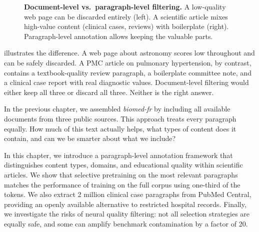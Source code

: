 \begin{figure}[t]
\caption{\textbf{Document-level vs.\ paragraph-level filtering.} A low-quality web page can be discarded entirely (left). A scientific article mixes high-value content (clinical cases, reviews) with boilerplate (right). Paragraph-level annotation allows keeping the valuable parts.}
\label{fig:motivation}
\end{figure}

\begin{reviewread}
 illustrates the difference. A web page about astronomy scores low throughout and can be safely discarded. A PMC article on pulmonary hypertension, by contrast, contains a textbook-quality review paragraph, a boilerplate committee note, and a clinical case report with real diagnostic values. Document-level filtering would either keep all three or discard all three. Neither is the right answer.
\end{reviewread}

\begin{reviewread}
In the previous chapter, we assembled \textit{biomed-fr} by including all available documents from three public sources. This approach treats every paragraph equally. How much of this text actually helps, what types of content does it contain, and can we be smarter about what we include?
\end{reviewread}

\begin{reviewread}
In this chapter, we introduce a paragraph-level annotation framework that distinguishes content types, domains, and educational quality within scientific articles. We show that selective pretraining on the most relevant paragraphs matches the performance of training on the full corpus using one-third of the tokens. We also extract 2 million clinical case paragraphs from PubMed Central, providing an openly available alternative to restricted hospital records. Finally, we investigate the risks of neural quality filtering: not all selection strategies are equally safe, and some can amplify benchmark contamination by a factor of 20.
\end{reviewread}


